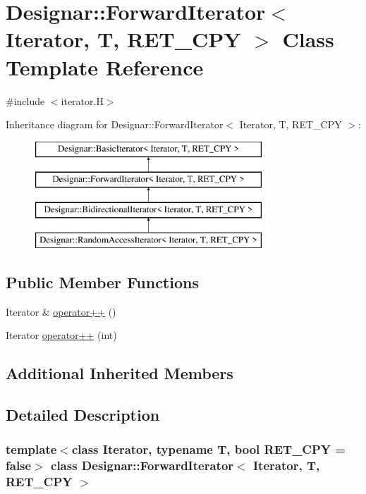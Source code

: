\hypertarget{class_designar_1_1_forward_iterator}{}\section{Designar\+:\+:Forward\+Iterator$<$ Iterator, T, R\+E\+T\+\_\+\+C\+PY $>$ Class Template Reference}
\label{class_designar_1_1_forward_iterator}


{\ttfamily \#include $<$iterator.\+H$>$}

Inheritance diagram for Designar\+:\+:Forward\+Iterator$<$ Iterator, T, R\+E\+T\+\_\+\+C\+PY $>$\+:\begin{figure}[H]
\begin{center}
\leavevmode
\includegraphics[height=4.000000cm]{class_designar_1_1_forward_iterator}
\end{center}
\end{figure}
\subsection*{Public Member Functions}
\begin{DoxyCompactItemize}
\item 
Iterator \& \hyperlink{class_designar_1_1_forward_iterator_a021a9305def76c968872089a778d2b41}{operator++} ()
\item 
Iterator \hyperlink{class_designar_1_1_forward_iterator_a7182625f3375ba05868ae6f240628b1c}{operator++} (int)
\end{DoxyCompactItemize}
\subsection*{Additional Inherited Members}


\subsection{Detailed Description}
\subsubsection*{template$<$class Iterator, typename T, bool R\+E\+T\+\_\+\+C\+PY = false$>$\newline
class Designar\+::\+Forward\+Iterator$<$ Iterator, T, R\+E\+T\+\_\+\+C\+P\+Y $>$}



